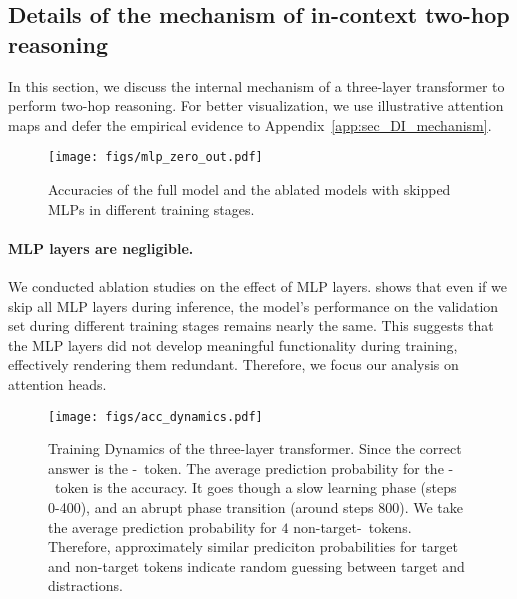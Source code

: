 

\subsection{Details of the mechanism of in-context two-hop reasoning}
\label{sec:illustration_mechanism}


In this section, we discuss the internal mechanism of a three-layer transformer to perform two-hop reasoning. For better visualization, we use illustrative attention maps and defer the empirical evidence to Appendix~\ref{app:sec_DI_mechanism}.


\begin{figure}[h]
    \centering
    \texttt{[image: figs/mlp\_zero\_out.pdf]}
    \caption{Accuracies of the full model and the ablated models with skipped MLPs in different training stages.}
    \label{fig:mlp_zero_out}
\end{figure}

\paragraph{MLP layers are negligible.} We conducted ablation studies on the effect of MLP layers.  shows that even if we skip all MLP layers during inference, the model's performance on the validation set during different training stages remains nearly the same.  This suggests that the MLP layers did not develop meaningful functionality during training, effectively rendering them redundant. Therefore, we focus our analysis on attention heads.

\begin{figure}[h]
    \centering
    \texttt{[image: figs/acc\_dynamics.pdf]}
    \caption{Training Dynamics of the three-layer transformer. Since the correct answer is the \target-\ed~token. The average prediction probability for the \target-\ed~token is the accuracy. It goes though a slow learning phase (steps 0-400), and an abrupt phase transition (around steps 800). We take the average prediction probability for $4$ non-target-\ed~tokens. Therefore, approximately similar prediciton probabilities for target and non-target tokens indicate random guessing between target and distractions.}
    \label{fig:acc_dynamics}
\end{figure}

